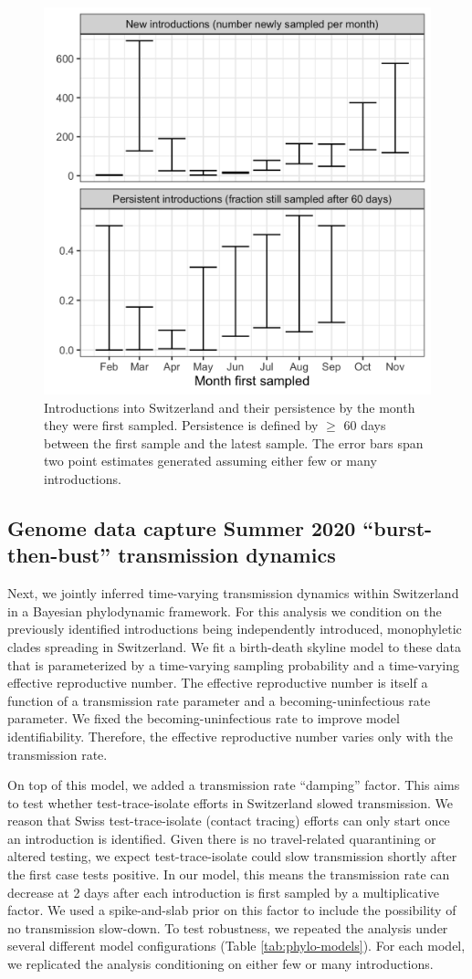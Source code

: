 \documentclass[9pt,twoside,lineno]{pnas-new} %
\begin{document}
\begin{figure}[H]
\centering
\includegraphics[width=.4\linewidth]{figures/introductions_and_persistance.png}
\caption{Introductions into Switzerland and their persistence by the month they were first sampled. Persistence is defined by $\geq$ 60 days between the first sample and the latest sample. The error bars span two point estimates generated assuming either few or many introductions.}
\label{fig:chain-longevity}
\end{figure}

\subsection{Genome data capture Summer 2020 ``burst-then-bust'' transmission dynamics}

Next, we jointly inferred time-varying transmission dynamics within Switzerland in a Bayesian phylodynamic framework. For this analysis we condition on the previously identified introductions being independently introduced, monophyletic clades spreading in Switzerland. We fit a birth-death skyline model to these data that is parameterized by a time-varying sampling probability and a time-varying effective reproductive number. The effective reproductive number is itself a function of a transmission rate parameter and a becoming-uninfectious rate parameter. We fixed the becoming-uninfectious rate to improve model identifiability. Therefore, the effective reproductive number varies only with the transmission rate. 

On top of this model, we added a transmission rate ``damping'' factor. This aims to test whether test-trace-isolate efforts in Switzerland slowed transmission. We reason that Swiss test-trace-isolate (contact tracing) efforts can only start once an introduction is identified. Given there is no travel-related quarantining or altered testing, we expect test-trace-isolate could slow transmission shortly after the first case tests positive. In our model, this means the transmission rate can decrease at 2 days after each introduction is first sampled by a multiplicative factor. We used a spike-and-slab prior on this factor to include the possibility of no transmission slow-down. To test robustness, we repeated the analysis under several different model configurations (Table \ref{tab:phylo-models}). For each model, we replicated the analysis conditioning on either few or many introductions. 
\end{document}
